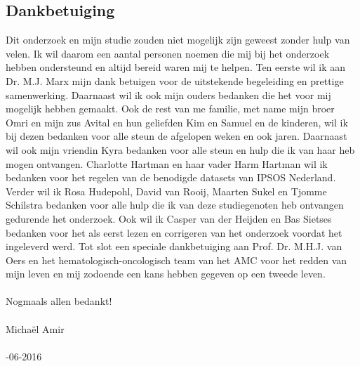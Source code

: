 \subsection{Dankbetuiging}
Dit onderzoek en mijn studie zouden niet mogelijk zijn geweest zonder hulp van velen. Ik wil daarom een aantal personen noemen die mij bij het onderzoek hebben ondersteund en altijd bereid waren mij te helpen. Ten eerste wil ik aan Dr. M.J. Marx mijn dank betuigen voor de uitstekende begeleiding en prettige samenwerking. Daarnaast wil ik ook mijn ouders bedanken die het voor mij mogelijk hebben gemaakt. Ook de rest van me familie, met name mijn broer Omri en mijn zus Avital en hun geliefden Kim en Samuel en de kinderen, wil ik bij dezen bedanken voor alle steun de afgelopen weken en ook jaren. Daarnaast wil ook mijn vriendin Kyra bedanken voor alle steun en hulp die ik van haar heb mogen ontvangen. Charlotte Hartman en haar vader Harm Hartman wil ik bedanken voor het regelen van de benodigde datasets van IPSOS Nederland. Verder wil ik Rosa Hudepohl, David van Rooij, Maarten Sukel en Tjomme Schilstra bedanken voor alle hulp die ik van deze studiegenoten heb ontvangen gedurende het onderzoek. Ook wil ik Casper van der Heijden en Bas Sietses bedanken voor het als eerst lezen en corrigeren van het onderzoek voordat het ingeleverd werd. Tot slot een speciale dankbetuiging aan Prof. Dr. M.H.J. van Oers en het hematologisch-oncologisch team van het AMC voor het redden van mijn leven en mij zodoende een kans hebben gegeven op een tweede leven.  \\\\


\noindent Nogmaals allen bedankt! \\\\

\noindent Micha\"{e}l Amir\\\\

-06-2016\\\\





























